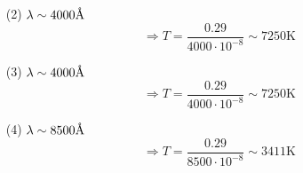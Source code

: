 \documentclass{article}
\theoremstyle{definition}
\begin{document}
\begin{enumerate}
\begin{enumerate}
			\item[(2)] $\lambda \sim 4000 \text{\r{A}}$
				\[
					\Rightarrow T = \frac{0.29}{4000 \cdot 10^{-8}} \sim 7250 \text{K}
				\]
				
			\item[(3)] $\lambda \sim 4000 \text{\r{A}}$
				\[
					\Rightarrow T = \frac{0.29}{4000 \cdot 10^{-8}} \sim 7250 \text{K}
				\]

			\item[(4)] $\lambda \sim 8500 \text{\r{A}}$
				\[
					\Rightarrow T = \frac{0.29}{8500 \cdot 10^{-8}} \sim 3411 \text{K}
				\]
		\end{enumerate}


\end{enumerate}
\end{document}
